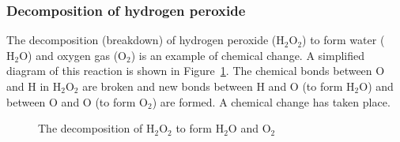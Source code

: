 \subsubsection*{Decomposition of hydrogen peroxide}
      \label{m38709*id62788}The decomposition (breakdown) of hydrogen peroxide ($\text{H}_{2}\text{O}_{2}$) to form water ($\text{H}_{2}\text{O}$) and oxygen gas ($\text{O}_{2}$) is an example of chemical change. A simplified diagram of this reaction is shown in Figure~\ref{fig:chemical change:decomposition}. The chemical bonds between $\text{O}$ and $\text{H}$ in $\text{H}_{2}\text{O}_{2}$ are broken and new bonds between $\text{H}$ and $\text{O}$ (to form $\text{H}_{2}\text{O}$) and between $\text{O}$ and $\text{O}$ (to form $\text{O}_{2}$) are formed. A chemical change has taken place.\par 
    \setcounter{subfigure}{0}
\begin{figure}[h]
\begin{center}
\end{center}
\caption{The decomposition of $\text{H}_{2}\text{O}_{2}$ to form $\text{H}_{2}\text{O}$ and $\text{O}_{2}$}
\label{fig:chemical change:decomposition}
\end{figure}     
\par
\label{m38709*secfhsst!!!underscore!!!id163}
